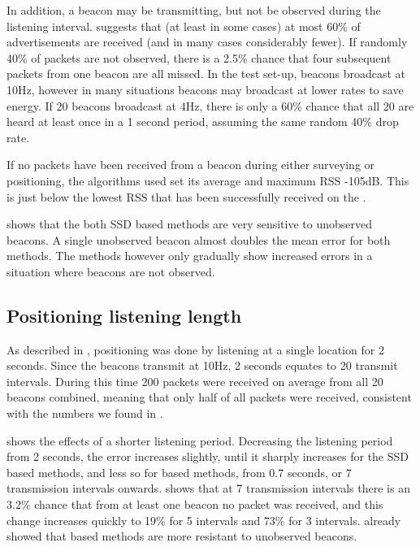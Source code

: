 In addition, a beacon may be transmitting, but not be observed during the listening interval.
 suggests that (at least in some cases) at most 60\% of advertisements are received (and in many cases considerably fewer).
If randomly 40\% of packets are not observed, there is a 2.5\% chance that four subsequent packets from one beacon are all missed.
In the test set-up, beacons broadcast at 10Hz, however in many situations beacons may broadcast at lower rates to save energy.
If 20 beacons broadcast at 4Hz, there is only a 60\% chance that all 20 are heard at least once in a 1 second period, assuming the same random 40\% drop rate.

If no packets have been received from a beacon during either surveying or positioning, the algorithms used set its average and maximum RSS -105dB.
This is just below the lowest RSS that has been successfully received on the \device.

 shows that the both SSD based methods are very sensitive to unobserved beacons.
A single unobserved beacon almost doubles the mean error for both methods.
The \aBRP methods however only gradually show increased errors in a situation where beacons are not observed.

\subsection{Positioning listening length}
As described in , positioning was done by listening at a single location for 2 seconds.
Since the beacons transmit at 10Hz, 2 seconds equates to 20 transmit intervals.
During this time 200 packets were received on average from all 20 beacons combined, meaning that only half of all packets were received, consistent with the numbers we found in .

 shows the effects of a shorter listening period.
Decreasing the listening period from 2 seconds, the error increases slightly, until it sharply increases for the SSD based methods, and less so for \aBRP based methods, from 0.7 seconds, or 7 transmission intervals onwards.
 shows that at 7 transmission intervals there is an 3.2\% chance that from at least one beacon no packet was received, and this change increases quickly to 19\% for 5 intervals and 73\% for 3 intervals.
 already showed that \aBRP based methods are more resistant to unobserved beacons.

